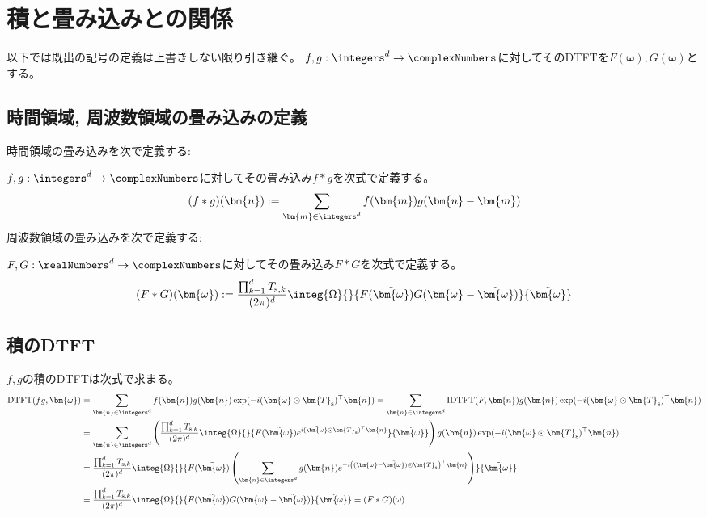 			\section{積と畳み込みとの関係}
				以下では既出の記号の定義は上書きしない限り引き継ぐ。
				$f,g:\integers^d\to\complexNumbers$に対してそのDTFTを$F(\bm{\omega}),G(\bm{\omega})$とする。
				\subsection{時間領域, 周波数領域の畳み込みの定義}
					時間領域の畳み込みを次で定義する:
					\par
					$f,g:\integers^d\to\complexNumbers$に対してその畳み込み$f*g$を次式で定義する。
					\[ (f*g)(\bm{n}) := \sum_{\bm{m}\in\integers^d} f(\bm{m})g(\bm{n}-\bm{m}) \]
					周波数領域の畳み込みを次で定義する:
					\par
					$F,G:\realNumbers^d\to\complexNumbers$に対してその畳み込み$F*G$を次式で定義する。
					\[ (F*G)(\bm{\omega}) := \frac{\prod_{k=1}^d T_{\text{s},k}}{(2\pi)^d}\integ{\Omega}{}{F(\tilde{\bm{\omega}})G(\bm{\omega}-\tilde{\bm{\omega}})}{\tilde{\bm{\omega}}} \]
				\subsection{積のDTFT}
					$f,g$の積のDTFTは次式で求まる。
					\begin{align*}
						\text{DTFT}(fg,\bm{\omega}) &= \sum_{\bm{n}\in\integers^d} f(\bm{n})g(\bm{n})\exp(-i(\bm{\omega}\odot\bm{T}_\text{s})^\top\bm{n}) = \sum_{\bm{n}\in\integers^d} \text{IDTFT}(F,\bm{n}) g(\bm{n})\exp(-i(\bm{\omega}\odot\bm{T}_\text{s})^\top\bm{n}) \\
						&= \sum_{\bm{n}\in\integers^d} \left(\frac{\prod_{k=1}^d T_{\text{s},k}}{(2\pi)^d}\integ{\Omega}{}{F(\tilde{\bm{\omega}})e^{i(\tilde{\bm{\omega}}\odot\bm{T}_\text{s})^\top\bm{n}}}{\tilde{\bm{\omega}}}\right) g(\bm{n})\exp(-i(\bm{\omega}\odot\bm{T}_\text{s})^\top\bm{n}) \\
						&= \frac{\prod_{k=1}^d T_{\text{s},k}}{(2\pi)^d}\integ{\Omega}{}{F(\tilde{\bm{\omega}})\left(\sum_{\bm{n}\in\integers^d} g(\bm{n})e^{-i\left((\bm{\omega}-\tilde{\bm{\omega}})\odot\bm{T}_\text{s}\right)^\top\bm{n}}\right)}{\tilde{\bm{\omega}}} \\
						&= \frac{\prod_{k=1}^d T_{\text{s},k}}{(2\pi)^d}\integ{\Omega}{}{F(\tilde{\bm{\omega}})G(\bm{\omega}-\tilde{\bm{\omega}})}{\tilde{\bm{\omega}}} = (F*G)(\omega)
					\end{align*}

